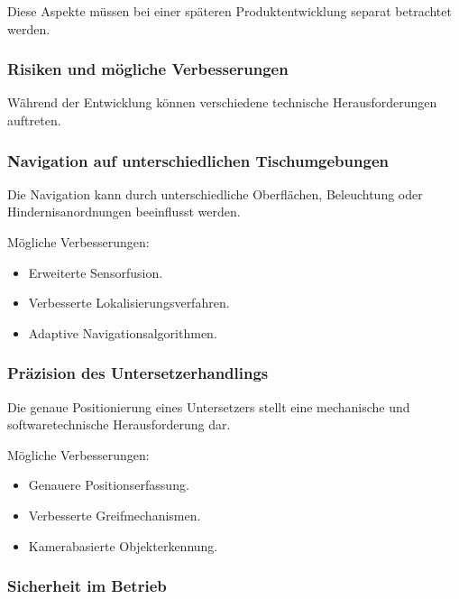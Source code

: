 \documentclass[
  a4paper,
  12pt,
  DIV=12,        %
  parskip=half,  %
  headings=small %
]{scrartcl}
\theoremstyle{definition}
\providecommand{\tightlist}{%
  \setlength{\itemsep}{0pt}\setlength{\parskip}{0pt}}
\theoremstyle{definition}
\begin{document}
Diese Aspekte müssen bei einer späteren Produktentwicklung separat
betrachtet werden.

\subsubsection{Risiken und mögliche
Verbesserungen}\label{risiken-und-muxf6gliche-verbesserungen}

Während der Entwicklung können verschiedene technische Herausforderungen
auftreten.

\subsubsection{Navigation auf unterschiedlichen
Tischumgebungen}\label{navigation-auf-unterschiedlichen-tischumgebungen}

Die Navigation kann durch unterschiedliche Oberflächen, Beleuchtung oder
Hindernisanordnungen beeinflusst werden.

Mögliche Verbesserungen:

\begin{itemize}
\tightlist
\item
  Erweiterte Sensorfusion.
\item
  Verbesserte Lokalisierungsverfahren.
\item
  Adaptive Navigationsalgorithmen.
\end{itemize}

\subsubsection{Präzision des
Untersetzerhandlings}\label{pruxe4zision-des-untersetzerhandlings}

Die genaue Positionierung eines Untersetzers stellt eine mechanische und
softwaretechnische Herausforderung dar.

Mögliche Verbesserungen:

\begin{itemize}
\tightlist
\item
  Genauere Positionserfassung.
\item
  Verbesserte Greifmechanismen.
\item
  Kamerabasierte Objekterkennung.
\end{itemize}

\subsubsection{Sicherheit im Betrieb}\label{sicherheit-im-betrieb}
\end{document}
